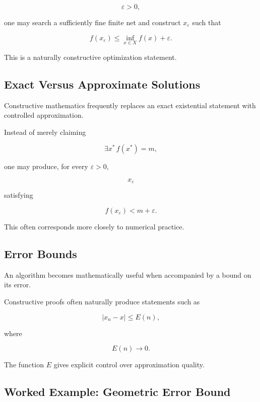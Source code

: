 \[
\varepsilon>0,
\]

one may search a sufficiently fine finite net and construct \(x_\varepsilon\)
such that

\[
\boxed{
f(x_\varepsilon)
\leq
\inf_{x\in X}f(x)
+
\varepsilon.
}
\]

This is a naturally constructive optimization statement.

\subsection{Exact Versus Approximate Solutions}
\label{subsec:exact-versus-approximate-constructive}

Constructive mathematics frequently replaces an exact existential statement
with controlled approximation.

Instead of merely claiming

\[
\boxed{
\exists x^*
\,
f(x^*)=m,
}
\]

one may produce, for every \(\varepsilon>0\),

\[
\boxed{
x_\varepsilon
}
\]

satisfying

\[
\boxed{
f(x_\varepsilon)
<
m+\varepsilon.
}
\]

This often corresponds more closely to numerical practice.

\subsection{Error Bounds}
\label{subsec:constructive-error-bounds}

An algorithm becomes mathematically useful when accompanied by a bound on
its error.

Constructive proofs often naturally produce statements such as

\[
\boxed{
|x_n-x|
\leq
E(n),
}
\]

where

\[
E(n)\to0.
\]

The function \(E\) gives explicit control over approximation quality.

\subsection{Worked Example: Geometric Error Bound}
\label{subsec:worked-geometric-error-bound}

